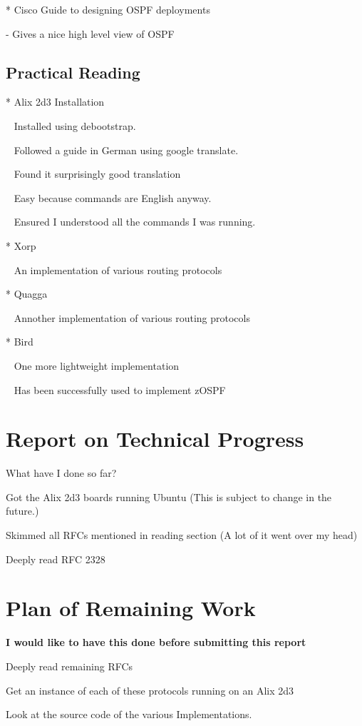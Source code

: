 \documentclass[12pt]{report}
\begin{document}
	* Cisco Guide to designing OSPF deployments  
		
		- Gives a nice high level view of OSPF

\section{Practical Reading}		

	* Alix 2d3 Installation
	
		~ Installed using debootstrap. 
	
		~ Followed a guide in German using google translate.
	
		~ Found it surprisingly good translation
	
		~ Easy because commands are English anyway.
	
		~ Ensured I understood all the commands I was running. 

	* Xorp
		
		~ An implementation of various routing protocols
	
	* Quagga

		~ Annother implementation of various routing protocols

	* Bird 

		~ One more lightweight implementation

		~ Has been successfully used to implement zOSPF

\chapter{Report on Technical Progress}
What have I done so far?

Got the Alix 2d3 boards running Ubuntu 
(This is subject to change in the future.)

Skimmed all RFCs mentioned in reading section 
(A lot of it went over my head)

Deeply read RFC 2328

\chapter{Plan of Remaining Work}

\em

\textbf{I would like to have this done before submitting this report}

Deeply read remaining RFCs

Get an instance of each of these protocols running on an Alix 2d3

Look at the source code of the various Implementations. 
\end{document}
